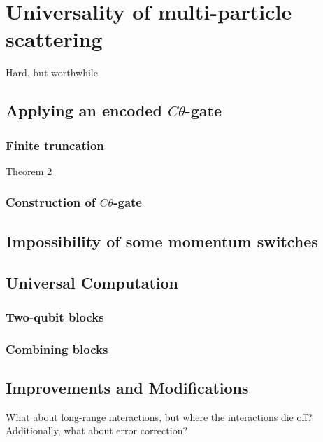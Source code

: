 % 

\chapter{Universality of multi-particle scattering}


Hard, but worthwhile






\section{Applying an encoded $C\theta$-gate}

\subsection{Finite truncation}

Theorem 2

\subsection{Construction of $C\theta$-gate}

\section{Impossibility of some momentum switches}

\section{Universal Computation}
\subsection{Two-qubit blocks}
\subsection{Combining blocks}


\section{Improvements and Modifications}

What about long-range interactions, but where the interactions die off?
Additionally, what about error correction?